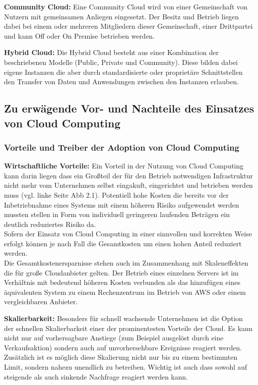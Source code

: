 \textbf{Community Cloud:} Eine Community Cloud wird von einer Gemeinschaft von Nutzern mit gemeinsamen
Anliegen eingesetzt. Der Besitz und Betrieb liegen dabei bei einem oder mehreren
Mitgliedern dieser Gemeinschaft, einer Drittpartei und kann Off oder On Premise betrieben
werden.

\textbf{Hybrid Cloud:} Die Hybrid Cloud besteht aus einer Kombination der beschriebenen Modelle
(Public, Private und Community). Diese bilden dabei eigene Instanzen die aber durch
standardisierte oder proprietäre Schnittstellen den Transfer von Daten und Anwendungen
zwischen den Instanzen erlauben.

\subsection{Zu erwägende Vor- und Nachteile des Einsatzes von Cloud Computing}

\subsubsection{\textbf{Vorteile und Treiber der Adoption von Cloud Computing}}

\textbf{Wirtschaftliche Vorteile:} Ein Vorteil in der Nutzung von Cloud Computing
kann darin liegen dass ein Großteil der für den Betrieb notwendigen Infrastruktur
nicht mehr vom Unternehmen selbst eingakuft, eingerichtet und betrieben werden
muss (vgl. linke Seite Abb 2.1). Potentiell hohe Kosten die bereits vor der
Inbetriebnahme eines Systems mit einem höheren Risiko aufgewendet werden mussten
stellen in Form von individuell geringeren laufenden Beträgen ein deutlich
reduziertes Risiko da.\\
Sofern der Einsatz von Cloud Computing in einer sinnvollen und korrekten
Weise erfolgt können je nach Fall die Gesamtkosten um einen hohen Anteil reduziert
werden.\\
Die Gesamtkostenersparnisse stehen auch im Zusammenhang mit Skaleneffekten die für
große Cloudanbieter gelten. Der Betrieb eines einzelnen Servers ist im Verhältnis
mit bedeutend höheren Kosten verbunden als das hinzufügen eines äquivalenten
System zu einem Rechenzentrum im Betrieb von AWS oder einem vergleichbaren
Anbieter.

\textbf{Skalierbarkeit:} Besonders für schnell wachsende Unternehmen ist die
Option der schnellen Skalierbarkeit einer der prominentesten Vorteile der Cloud.
Es kann nicht nur auf vorhersagbare Anstiege (zum Beispiel ausgelöst durch
eine Verkaufsaktion) sondern auch auf unvorhersehbare Ereignisse reagiert werden.
Zusätzlich ist es möglich diese Skalierung nicht nur bis zu einem bestimmten Limit,
sondern nahezu unendlich zu betreiben. Wichtig ist auch dass sowohl auf steigende
als auch sinkende Nachfrage reagiert werden kann.

